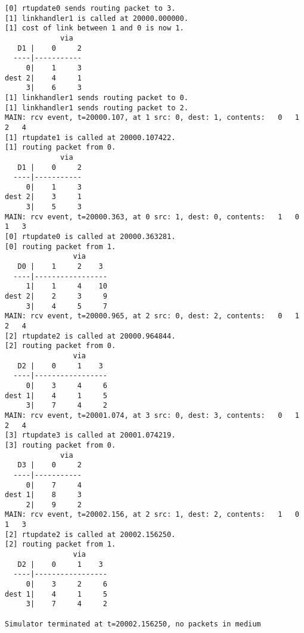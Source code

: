 \documentclass[12pt]{article}
\begin{document}
\begin{Verbatim}
[0] rtupdate0 sends routing packet to 3.
[1] linkhandler1 is called at 20000.000000.
[1] cost of link between 1 and 0 is now 1.
             via   
   D1 |    0     2 
  ----|-----------
     0|    1     3
dest 2|    4     1
     3|    6     3
[1] linkhandler1 sends routing packet to 0.
[1] linkhandler1 sends routing packet to 2.
MAIN: rcv event, t=20000.107, at 1 src: 0, dest: 1, contents:   0   1   2   4
[1] rtupdate1 is called at 20000.107422.
[1] routing packet from 0.
             via   
   D1 |    0     2 
  ----|-----------
     0|    1     3
dest 2|    3     1
     3|    5     3
MAIN: rcv event, t=20000.363, at 0 src: 1, dest: 0, contents:   1   0   1   3
[0] rtupdate0 is called at 20000.363281.
[0] routing packet from 1.
                via     
   D0 |    1     2    3 
  ----|-----------------
     1|    1     4    10
dest 2|    2     3     9
     3|    4     5     7
MAIN: rcv event, t=20000.965, at 2 src: 0, dest: 2, contents:   0   1   2   4
[2] rtupdate2 is called at 20000.964844.
[2] routing packet from 0.
                via     
   D2 |    0     1    3 
  ----|-----------------
     0|    3     4     6
dest 1|    4     1     5
     3|    7     4     2
MAIN: rcv event, t=20001.074, at 3 src: 0, dest: 3, contents:   0   1   2   4
[3] rtupdate3 is called at 20001.074219.
[3] routing packet from 0.
             via     
   D3 |    0     2 
  ----|-----------
     0|    7     4
dest 1|    8     3
     2|    9     2
MAIN: rcv event, t=20002.156, at 2 src: 1, dest: 2, contents:   1   0   1   3
[2] rtupdate2 is called at 20002.156250.
[2] routing packet from 1.
                via     
   D2 |    0     1    3 
  ----|-----------------
     0|    3     2     6
dest 1|    4     1     5
     3|    7     4     2

Simulator terminated at t=20002.156250, no packets in medium

\end{Verbatim}
\end{document}
